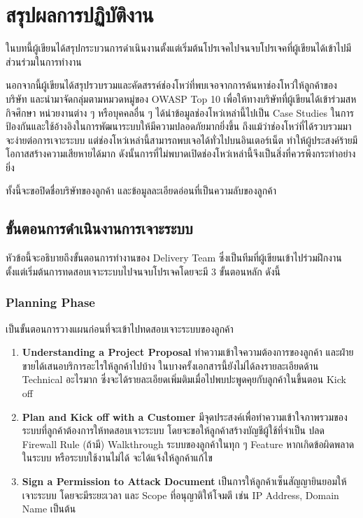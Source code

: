 \chapter{สรุปผลการปฏิบัติงาน}
\label{chapter:experiment}

ในบทนี้ผู้เขียนได้สรุปกระบวนการดำเนินงานตั้งแต่เริ่มต้นโปรเจคไปจนจบโปรเจคที่ผู้เขียนได้เข้าไปมีส่วนร่วมในการทำงาน

นอกจากนี้ผู้เขียนได้สรุปรวบรวมและคัดสรรค์ช่องโหว่ที่พบเจอจากการค้นหาช่องโหว่ให้ลูกค้าของบริษัท และนำมาจัดกลุ่มตามหมวดหมู่ของ OWASP Top 10 เพื่อให้ทางบริษัทที่ผู้เขียนได้เข้าร่วมสหกิจศึกษา หน่วยงานต่าง ๆ  หรือบุคคลอื่น ๆ ได้นำข้อมูลช่องโหว่เหล่านี้ไปเป็น Case Studies ในการป้องกันและใช้อ้างอิงในการพัฒนาระบบให้มีความปลอดภัยมากยิ่งขึ้น ถึงแม้ว่าช่องโหว่ที่ได้รวบรวมมาจะง่ายต่อการเจาะระบบ แต่ช่องโหว่เหล่านี้สามารถพบเจอได้ทั่วไปบนอินเตอร์เน็ต ทำให้ผู้ประสงค์ร้ายมีโอกาสสร้างความเสียหายได้มาก ดังนั้นการที่ไม่พบาดเปิดช่องโหว่เหล่านี้จึงเป็นสิ่งที่ควรพึงกระทำอย่างยิ่ง

ทั้งนี้จะขอปิดชื่อบริษัทของลูกค้า และข้อมูลละเอียดอ่อนที่เป็นความลับของลูกค้า

\section{ขั้นตอนการดำเนินงานการเจาะระบบ}

หัวข้อนี้จะอธิบายถึงขั้นตอนการทำงานของ Delivery Team ซึ่งเป็นทีมที่ผู้เขียนเข้าไปร่วมฝึกงานตั้งแต่เริ่มต้นการทดสอบเจาะระบบไปจนจบโปรเจคโดยจะมี 3 ขั้นตอนหลัก ดังนี้

\subsection{Planning Phase}

เป็นขั้นตอนการวางแผนก่อนที่จะเข้าไปทดสอบเจาะระบบของลูกค้า

\begin{enumerate}
	\itemsep0em 
	\item \textbf{Understanding a Project Proposal} ทำความเข้าใจความต้องการของลูกค้า และฝ่ายขายได้เสนอบริการอะไรให้ลูกค้าไปบ้าง ในบางครั้งเอกสารนี้ยังไม่ได้ลงรายละเอียดด้าน Technical อะไรมาก ซึ่งจะได้รายละเอียดเพิ่มติมเมื่อไปพบปะพูดคุยกับลูกค้าในขึ้นตอน Kick off
	\item \textbf{Plan and Kick off with a Customer} มีจุดประสงค์เพื่อทำความเข้าใจภาพรวมของระบบที่ลูกค้าต้องการให้ทดสอบเจาะระบบ โดยจะขอให้ลูกค้าสร้างบัญชีผู้ใช้ที่จำเป็น ปลด Firewall Rule (ถ้ามี) Walkthrough ระบบของลูกค้าในทุก ๆ Feature หากเกิดข้อผิดพลาดในระบบ หรือระบบใช้งานไม่ได้ จะได้แจ้งให้ลูกค้าแก้ไข
	\item \textbf{Sign a Permission  to Attack Document} เป็นการให้ลูกค้าเซ็นสัญญายินยอมให้เจาะระบบ โดยจะมีระยะเวลา และ Scope ที่อนุญาติให้โจมตี เช่น IP Address, Domain Name เป็นต้น
\end{enumerate}

